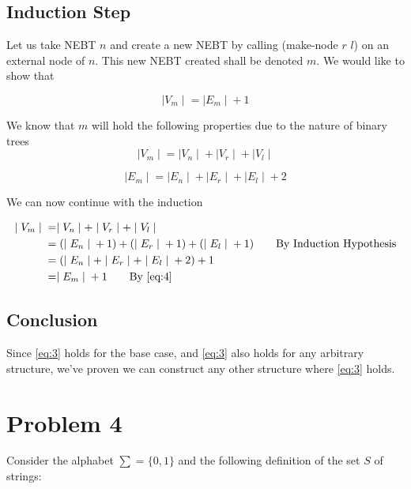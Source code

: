 \documentclass[paper=a4, fontsize=11pt]{scrartcl} %
\numberwithin{equation}{section} %
\numberwithin{figure}{section} %
\numberwithin{table}{section} %
\begin{document}
\subsection{Induction Step}
Let us take NEBT $n$ and create a new NEBT by calling (make-node $r$ $l$) on an external node of $n$. This new NEBT created shall be denoted $m$. We would like to show that 

\begin{equation}
\mid{V_m}\mid{} = \mid{E_m}\mid{} + 1
\end{equation}

We know that $m$ will hold the following properties due to the nature of binary trees
\begin{equation}
\mid{V_m}\mid{} = \mid{V_n}\mid{} + \mid{V_r}\mid{} + \mid{V_l}\mid{}
\end{equation}

\begin{equation}\label{eq:4}
\mid{E_m}\mid{} = \mid{E_n}\mid{} + \mid{E_r}\mid{} + \mid{E_l}\mid{}+2
\end{equation}

We can now continue with the induction

\begin{align} 
\mid{V_m}\mid{} &= \mid{V_n}\mid{} + \mid{V_r}\mid{} + \mid{V_l}\mid{}\\
				&= (\mid{E_n}\mid{} + 1) + (\mid{E_r}\mid{} + 1) + (\mid{E_l}\mid{} + 1)\tag*{By Induction Hypothesis}\\
				&= (\mid{E_n}\mid{} + \mid{E_r}\mid{} + \mid{E_l}\mid{} +2) +1 \tag*{}\\
				&= \mid{E_m}\mid{}+1 \tag*{By \ref{eq:4}} \\
\end{align}
\subsection{Conclusion}

Since \ref{eq:3} holds for the base case, and \ref{eq:3} also holds for any arbitrary structure, we've proven we can construct any other structure where \ref{eq:3} holds.

\section{Problem 4}
Consider the alphabet $\sum = \{0,1\}$ and the following definition of the set $S$ of strings:
\end{document}

